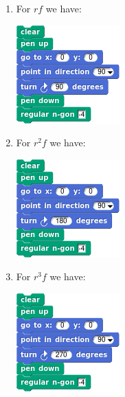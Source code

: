 \documentclass[noauthor,nooutcomes,12pt,hints,handout]{ximera}
\begin{document}
\begin{question}
\begin{freeResponse}
\begin{enumerate}
\begin{center}
      \end{center}
    \item For $rf$ we have:
      \begin{center}
        \includegraphics[width=.3\textwidth]{rfSqSCRIPT.png}   \qquad {}
      \end{center}
    \item For $r^2f$ we have:
      \begin{center}
        \includegraphics[width=.3\textwidth]{r2fSqSCRIPT.png}   \qquad {}
      \end{center}
    \item For $r^3f$ we have:
      \begin{center}
        \includegraphics[width=.3\textwidth]{r3fSqSCRIPT.png}   \qquad {}

\end{center}
\end{enumerate}
\end{freeResponse}
\end{question}
\end{document}
